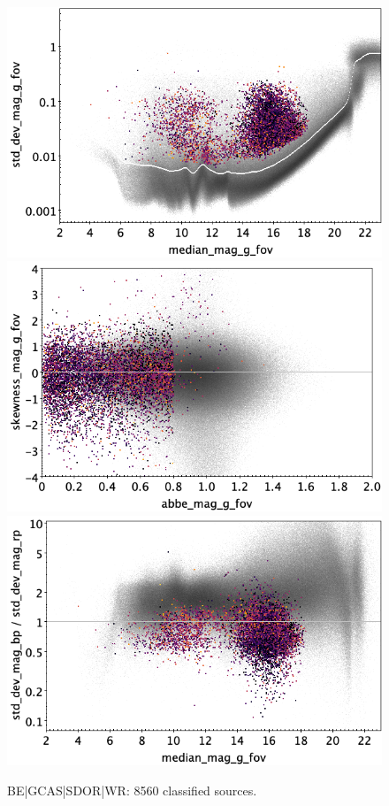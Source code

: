 \documentclass[longauth]{aa}
\begin{document}
\begin{appendix}
\begin{figure}
\hspace{2mm}
 \includegraphics[width=0.45\hsize]{figures/appendix/BE_cls_msd.png} \\ %
\vspace{4mm}
 \includegraphics[width=0.45\hsize]{figures/appendix/BE_cls_ask.png}  %
\hspace{2mm}
 \includegraphics[width=0.45\hsize]{figures/appendix/BE_cls_msdr.png}  \\ %
\vspace{4mm}
 \caption{BE|GCAS|SDOR|WR: 8560 classified sources.}  
 \label{fig:app:BE}
\end{figure}


\end{appendix}
\end{document}
